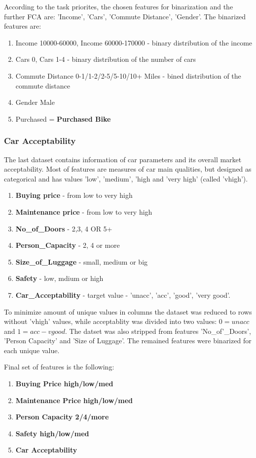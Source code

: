 According to the task priorites, the chosen features for binarization and the further FCA are: 'Income', 'Cars', 'Commute Distance', 'Gender'.
The binarized features are:

\begin{enumerate}
\item {Income 10000-60000, Income 60000-170000} - binary distribution of the income
\item {Cars 0, Cars 1-4} - binary distribution of the number of cars
\item {Commute Distance 0-1/1-2/2-5/5-10/10+ Miles} - bined distribution of the commute distance
\item {Gender Male}
\item {Purchased} = \textbf{Purchased Bike}
\end{enumerate}


\subsubsection{Car Acceptability}

The last dataset contains information of car parameters and its overall market acceptability.
Most of features are measures of car main qualities, but designed as categorical and has values 'low', 'medium', 'high and 'very high' (called 'vhigh'). 

\begin{enumerate}
\item \textbf{Buying price} - from low to very high
\item \textbf{Maintenance price} - from low to very high
\item \textbf{No\_of\_Doors} - 2,3, 4 OR 5+
\item \textbf{Person\_Capacity} - 2, 4 or more
\item \textbf{Size\_of\_Luggage} - small, medium or big
\item \textbf{Safety} - low, mdium or high
\item \textbf{Car\_Acceptability} - target value - 'unacc', 'acc', 'good', 'very good'.
\end{enumerate}

To minimize amount of unique values in columns the dataset was reduced to rows without 'vhigh' values, while acceptablity was divided into two values: $0 = unacc$ and $1 = acc-vgood$.
The datset was also stripped from features 'No\_of'\_Doors', 'Person Capacity' and 'Size of Luggage'. The remained features were binarized for each unique value.

Final set of features is the following:

\begin{enumerate}
\item \textbf{Buying Price high/low/med }
\item \textbf{Maintenance Price high/low/med}
\item \textbf{Person Capacity 2/4/more}
\item \textbf{Safety high/low/med}
\item \textbf{Car Acceptability}
\end{enumerate}


